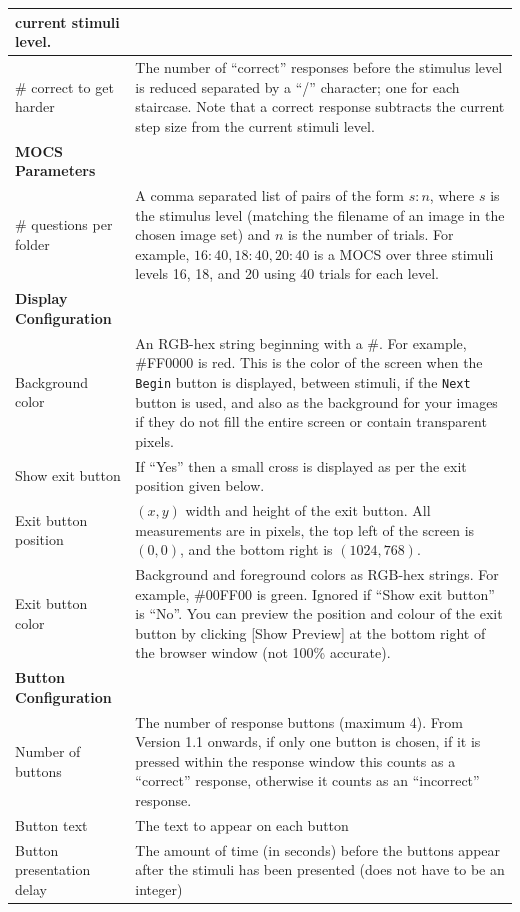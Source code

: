\documentclass{article}
\begin{document}
\begin{longtable}{|p{5cm}|p{10cm}|}
            current stimuli level.\\
\hline
\# correct to get harder & The number of ``correct'' responses before 
            the stimulus level is reduced
            separated by a ``/'' character; one for each staircase.
            Note
            that a correct response subtracts the current step size from the 
            current stimuli level.\\
\hline
\hline
{\bf MOCS Parameters} & \\\nopagebreak
\# questions per folder & A comma separated list of pairs of the form $s:n$, where $s$ is the stimulus
level (matching the filename of an image in the chosen image set) and $n$ is the number of trials. For
example, $16:40,18:40,20:40$ is a MOCS over three stimuli levels 16, 18, and 20 using 40 trials for
each level.\\
\hline
\hline
{\bf Display Configuration} & \\\nopagebreak
Background color & An RGB-hex string beginning with a \#. For example, \#FF0000 is red. This is the
color of the screen when the {\tt Begin} button is displayed, between stimuli, 
    if the {\tt Next} button is used, 
and also as the background for your images if they do
not fill the entire screen or contain transparent pixels.\\ 
\hline
Show exit button & If ``Yes'' then a small cross is displayed as per the exit position given below.\\
\hline
Exit button position & $(x,y)$ width and height
of the exit button. All measurements are in pixels, the top left of the screen is $(0,0)$, and the bottom right is $(1024,768)$.\\
\hline
Exit button color & Background and foreground colors as RGB-hex strings. For example, \#00FF00 is
green. Ignored if ``Show exit button'' is ``No''. You can preview the position and colour of the exit button by clicking [Show Preview] at the bottom right of the browser window (not 100\% accurate).\\
\hline
\hline
{\bf Button Configuration} & \\\nopagebreak
Number of buttons & The number of response buttons (maximum 4). From Version 1.1 onwards, 
if only one button is chosen, if it is pressed within the response window this counts as a ``correct'' response,
otherwise it counts as an ``incorrect'' response.\\
\hline
Button text & The text to appear on each button\\
\hline
Button presentation delay & The amount of time (in seconds) before the buttons appear after the stimuli has been presented (does not have to be an integer)\\

\end{longtable}
\end{document}
